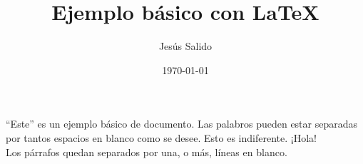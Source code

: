 \documentclass[11pt,a4paper]{article}
\title{Ejemplo básico con \LaTeX}
\author{Jesús Salido}
\date{\today}
\begin{document}
\maketitle


“Este” es un ejemplo básico de documento. Las     palabros        pueden estar       separadas por tantos         espacios     en blanco   como se desee. Esto es indiferente. ¡Hola!\\[5cm]





           Los párrafos quedan separados por una, o más, líneas en blanco.
           
           
           
\end{document}
